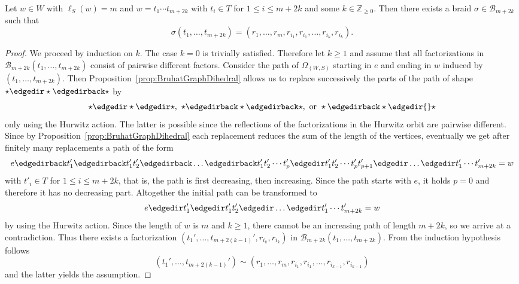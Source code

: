 



\begin{lemma}\label{lem:same_refl}
Let $w\in W$ with $\ell_{S}(w)=m$ and $w=t_{1}\cdots t_{m+2k}$ with $t_{i}\in T$ for $1\leq i \leq m+2k$ and some $k \in \mathbb{Z}_{\geq 0}$. Then there exists a braid $\sigma \in \mathcal{B}_{m+2k}$ such that 
\[
\sigma(t_{1},\ldots,t_{m+2k})=(r_{1},\ldots,r_{m},r_{i_1},r_{i_1}, \ldots , r_{i_k},r_{i_k}).
\]
\end{lemma}

\begin{proof}
We proceed by induction on $k$. The case $k=0$ is trivially satisfied. Therefore let $k\geq 1$ and assume that all factorizations in $\mathcal{B}_{m+2k}(t_{1},\ldots,t_{m+2k})$ consist of pairwise different factors. Consider the path of $\Omega_{(W,S)}$ starting in $e$ and ending in $w$ induced by $(t_{1},\ldots,t_{m+2k})$. Then Proposition~\ref{prop:BruhatGraphDihedral} allows us to replace successively the parts of the path of shape $\star \edgedir \star \edgedirback \star$ by
\[
\star \edgedir \star \edgedir \star, ~\star \edgedirback \star \edgedirback \star, ~\text{or } \star \edgedirback \star \edgedir {} \star
\] 
only using the Hurwitz action. The latter is possible since the reflections of the factorizations in the Hurwitz orbit are pairwise different. Since by Proposition~\ref{prop:BruhatGraphDihedral} each replacement reduces the sum of the length of the vertices, eventually we get after finitely many replacements a path of the form
\[
e\edgedirback t'_{1}\edgedirback t'_{1}t'_{2}\edgedirback \ldots \edgedirback t'_{1}t'_{2}\cdots t'_{p}\edgedir t'_{1}t'_{2}\cdots t'_{p}t'_{p+1}\edgedir \ldots \edgedir t'_{1}\cdots t'_{m+2k}=w
\]
with $t'_{i}\in T$ for $1\leq i \leq m+2k$, that is, the path is first decreasing, then increasing. Since the path starts with $e$, it holds $p=0$ and therefore it has no decreasing part. Altogether the initial path can be transformed to
\[
e \edgedir t'_{1}\edgedir t'_{1}t'_{2}\edgedir \ldots \edgedir t'_{1}\cdots t'_{m+2k}=w
\]
by using the Hurwitz action. Since the length of $w$ is $m$ and $k\geq 1$, there cannot be an increasing path of length $m+2k$, so we arrive at a contradiction. Thus there exists a factorization $(t_{1}',\ldots,t_{m+2(k-1)}',r_{i_{k}},r_{i_{k}})$ in $\mathcal{B}_{m+2k}(t_{1},\ldots,t_{m+2k})$. From the induction hypothesis follows 
\[
(t_{1}',\ldots,t_{m+2(k-1)}')\sim (r_{1},\ldots,r_{m},r_{i_{1}},r_{i_{1}},\ldots,r_{i_{k-1}},r_{i_{k-1}})
\] 
and the latter yields the assumption.
\end{proof}




